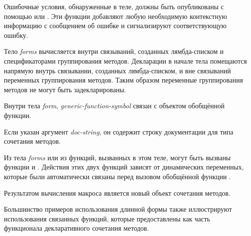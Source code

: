 \begin{defmac}
Ошибочные условия, обнаруженные в теле, должны быть опубликованы с
помощью  или .
Эти функции добавляют любую необходимую контекстную информацию с сообщением об
ошибке и сигнализируют соответствующую ошибку.

Тело \emph{forms} вычисляется внутри связываний, созданных лямбда-списком и
спецификаторами группирования методов. Декларации в начале тела помещаются
напрямую внутрь связывании, созданных лямбда-списком, и вне связываний
переменных группирования методов. Таким образом переменные группирования методов
не могут быть задекларированы.

Внутри тела \emph{form}, \emph{generic-function-symbol} связан с объектом
обобщённой функции.

Если указан аргумент \emph{doc-string}, он содержит строку документации для типа
сочетания методов.

Из тела \emph{forms} или из функций, вызванных в этом теле, могут быть вызваны
функции  и . Действия
этих двух функций зависят от динамических переменных, которые были автоматически
связаны перед вызовом обобщённой функции .

Результатом вычисления макроса  является новый
объект сочетания методов.

Большинство примеров использования длинной формы 
также иллюстрируют использования связанных функций, которые предоставлены как
часть функционала декларативного сочетания методов.


\end{defmac}
